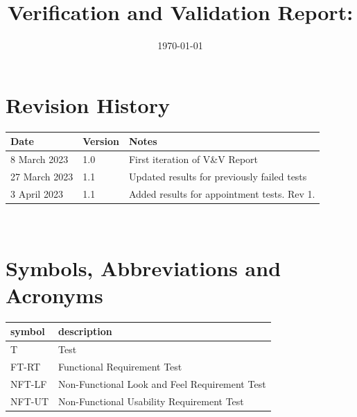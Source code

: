 \documentclass[12pt, titlepage]{article}
\begin{document}
\title{Verification and Validation Report: \progname} 
\author{\authname}
\date{\today}
	
\maketitle


\section{Revision History}

\begin{tabularx}{\textwidth}{p{3cm}p{2cm}X}
\toprule {\bf Date} & {\bf Version} & {\bf Notes}\\
\midrule
8 March 2023 & 1.0 & First iteration of V\&V Report \\
27 March 2023 & 1.1 & Updated results for previously failed tests\\
3 April 2023 & 1.1 & Added results for appointment tests. Rev 1.\\
\bottomrule
\end{tabularx}

~\newpage

\section{Symbols, Abbreviations and Acronyms}

\renewcommand{\arraystretch}{1.2}
\begin{tabular}{l l} 
  \toprule		
  \textbf{symbol} & \textbf{description}\\
  \midrule 
  T & Test\\
  FT-RT & Functional Requirement Test \\
  NFT-LF & Non-Functional Look and Feel Requirement Test \\
  NFT-UT & Non-Functional Usability Requirement Test \\
  \bottomrule
\end{tabular}\\


\newpage

\tableofcontents

\listoftables %

\listoffigures %

\newpage
\end{document}

